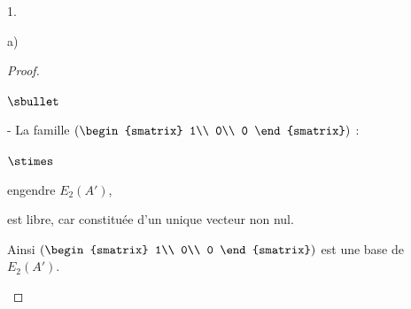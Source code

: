 \documentclass[11pt]{article}%
\begin{document}
\begin{noliste}{1.}
\begin{noliste}{a)}
\begin{proof}
\begin{noliste}{$\sbullet$}
\begin{noliste}{-}
	  La famille $\left(
	  \begin{smatrix}
	    1\\
	    0\\
	    0
	  \end{smatrix}\right)$ :
	  \end{noliste}
	  \begin{liste}{$\stimes$}
	    \item engendre $E_2(A')$,
	    \item est libre, car constituée d'un unique vecteur non 
	    nul.
	  \end{liste}
	  Ainsi $\left(
	  \begin{smatrix}
	    1\\
	    0\\
	    0
	  \end{smatrix}\right)$ est une base de $E_2(A')$.
	  

\end{noliste}
\end{proof}
\end{noliste}
\end{noliste}
\end{document}

